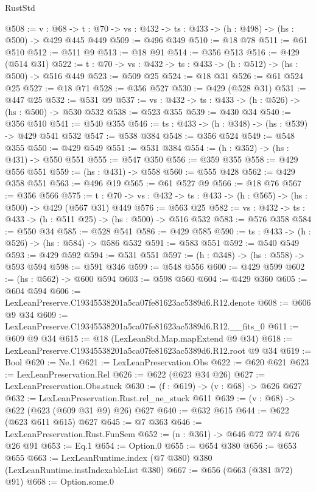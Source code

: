 \begin{lexlean}{RustStd}
\begin{coremodule}
@508 := {v : @68} ->
  {t : @70} -> {vs : @432} -> {ts : @433} -> (h : @498) -> (hs : @500) -> @429 @445 @449
@509 := @496 @349
@510 := @18 @78
@511 := @61 @510
@512 := @511 @9
@513 := @18 @91
@514 := @356 @513
@516 := @429 (@514 @31)
@522 := {t : @70} -> {vs : @432} -> {ts : @433} -> (h : @512) -> (hs : @500) -> @516 @449
@523 := @509 @25
@524 := @18 @31
@526 := @61 @524 @25
@527 := @18 @71
@528 := @356 @527
@530 := @429 (@528 @31)
@531 := @447 @25
@532 := @531 @9
@537 := {vs : @432} -> {ts : @433} -> (h : @526) -> (hs : @500) -> @530 @532
@538 := @523 @355
@539 := @430 @34
@540 := @356 @510
@541 := @540 @355
@546 := {ts : @433} -> (h : @348) -> (hs : @539) -> @429 @541 @532
@547 := @538 @384
@548 := @356 @524
@549 := @548 @355
@550 := @429 @549
@551 := @531 @384
@554 := (h : @352) -> (hs : @431) -> @550 @551
@555 := @547 @350
@556 := @359 @355
@558 := @429 @556 @551
@559 := (hs : @431) -> @558
@560 := @555 @428
@562 := @429 @358 @551
@563 := @496 @19
@565 := @61 @527 @9
@566 := @18 @76
@567 := @356 @566
@575 := {t : @70} -> {vs : @432} -> {ts : @433} -> (h : @565) -> (hs : @500) -> @429 (@567 @31) @449
@576 := @563 @25
@582 := {vs : @432} -> {ts : @433} -> (h : @511 @25) -> (hs : @500) -> @516 @532
@583 := @576 @358
@584 := @550 @34
@585 := @528 @541
@586 := @429 @585
@590 := {ts : @433} -> (h : @526) -> (hs : @584) -> @586 @532
@591 := @583 @551
@592 := @540 @549
@593 := @429 @592
@594 := @531 @551
@597 := (h : @348) -> (hs : @558) -> @593 @594
@598 := @591 @346
@599 := @548 @556
@600 := @429 @599
@602 := (hs : @562) -> @600 @594
@603 := @598 @560
@604 := @429 @360
@605 := @604 @594
@606 := LexLeanPreserve.C19345538201a5ca07fe81623ac5389d6.R12.denote
@608 := @606 @9 @34
@609 := LexLeanPreserve.C19345538201a5ca07fe81623ac5389d6.R12.__fits_0
@611 := @609 @9 @34
@615 := @18 (LexLeanStd.Map.mapExtend @9 @34)
@618 := LexLeanPreserve.C19345538201a5ca07fe81623ac5389d6.R12.root @9 @34
@619 := Bool
@620 := Ne.{1}
@621 := LexLeanPreservation.Obs
@622 := @620 @621
@623 := LexLeanPreservation.Rel
@626 := @622 (@623 @34 @26)
@627 := LexLeanPreservation.Obs.stuck
@630 := (f : @619) -> (v : @68) -> @626 @627
@632 := LexLeanPreservation.Rust.rel_ne_stuck @611
@639 := (v : @68) -> @622 (@623 (@609 @31 @9) @26) @627
@640 := @632 @615
@644 := @622 (@623 @611 @615) @627
@645 := @7 @363
@646 := LexLeanPreservation.Rust.FunSem
@652 := (n : @361) -> @646 @72 @74 @76 @26 @91
@653 := Eq.{1}
@654 := Option.{0}
@655 := @654 @380
@656 := @653 @655
@663 := LexLeanRuntime.index (@7 @380) @380 (LexLeanRuntime.instIndexableList @380)
@667 := @656 (@663 (@381 @72) @91)
@668 := Option.some.{0}

\end{coremodule}
\end{lexlean}
